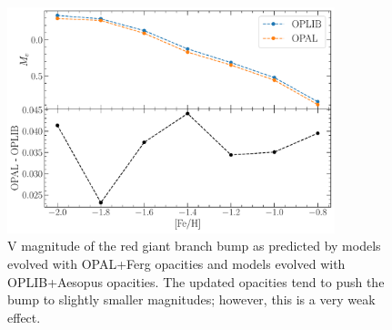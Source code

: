 \begin{figure}
  \centering
  \includegraphics[width=0.85\textwidth]{figures/rgbb/OPALvsOPLIBComparison.pdf}
  \caption{V magnitude of the red giant branch bump as predicted by models
  evolved with OPAL+Ferg opacities and models evolved with OPLIB+Aesopus
  opacities. The updated opacities tend to push the bump to slightly smaller
  magnitudes; however, this is a very weak effect.}
  \label{fig:OPALvsOPLIBRGBB}
\end{figure}

